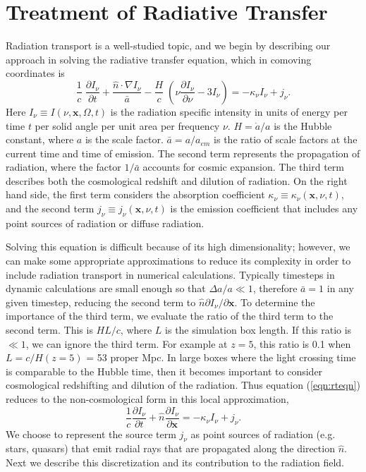 \documentclass[useAMS,usenatbib,a4paper]{mn2e}
\begin{document}
\section{Treatment of Radiative Transfer}

Radiation transport is a well-studied topic, and we begin by
describing our approach in solving the radiative transfer equation,
which in comoving coordinates \citep{Gnedin97} is
%
\begin{equation}
  \label{eqn:rteqn}
  \frac{1}{c} \; \frac{\partial I_\nu}{\partial t} + 
  \frac{\hat{n} \cdot \nabla I_\nu}{\bar{a}} -
  \frac{H}{c} \; \left( \nu \frac{\partial I_\nu}{\partial \nu} -
  3 I_\nu \right) = -\kappa_\nu I_\nu + j_\nu .
\end{equation}
%
Here $I_\nu \equiv I(\nu, \mathbf{x}, \Omega, t)$ is the radiation
specific intensity in units of energy per time $t$ per solid angle per
unit area per frequency $\nu$.  $H = \dot{a}/a$ is the Hubble
constant, where $a$ is the scale factor.  $\bar{a} = a/a_{em}$ is the
ratio of scale factors at the current time and time of emission.  The
second term represents the propagation of radiation, where the factor
$1/\bar{a}$ accounts for cosmic expansion.  The third term describes
both the cosmological redshift and dilution of radiation.  On the
right hand side, the first term considers the absorption coefficient
$\kappa_\nu \equiv \kappa_\nu(\mathbf{x},\nu,t)$, and the second term
$j_\nu \equiv j_\nu(\mathbf{x},\nu,t)$ is the emission coefficient
that includes any point sources of radiation or diffuse radiation.

Solving this equation is difficult because of its high dimensionality;
however, we can make some appropriate approximations to reduce its
complexity in order to include radiation transport in numerical
calculations.  Typically timesteps in dynamic calculations are small
enough so that $\Delta a/a \ll 1$, therefore $\bar{a} = 1$ in any
given timestep, reducing the second term to $\hat{n} \partial
I_\nu/\partial \mathbf{x}$.  To determine the importance of the third
term, we evaluate the ratio of the third term to the second term.
This is $HL/c$, where $L$ is the simulation box length.  If this ratio
is $\ll 1$, we can ignore the third term.  For example at $z=5$, this
ratio is 0.1 when $L = c/H(z=5)$ = 53 proper Mpc.  In large boxes
where the light crossing time is comparable to the Hubble time, then
it becomes important to consider cosmological redshifting and dilution
of the radiation.  Thus equation (\ref{eqn:rteqn}) reduces to the
non-cosmological form in this local approximation,
%
\begin{equation}
  \frac{1}{c} \frac{\partial I_\nu}{\partial t} + 
  \hat{n} \frac{\partial I_\nu}{\partial \mathbf{x}} =
  -\kappa_\nu I_\nu + j_\nu .
\end{equation}
%
We choose to represent the source term $j_\nu$ as point sources of
radiation (e.g. stars, quasars) that emit radial rays that are
propagated along the direction $\hat{n}$.  Next we describe this
discretization and its contribution to the radiation field.
\end{document}
